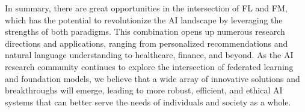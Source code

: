 


In summary, there are great opportunities in the intersection of FL and FM, 
which has the potential to revolutionize the AI landscape by leveraging the strengths of both paradigms. 
This combination opens up numerous research directions and applications, ranging from personalized recommendations and natural language understanding to healthcare, finance, and beyond. As the AI research community continues to explore the intersection of federated learning and foundation models, we believe that a wide array of innovative solutions and breakthroughs will emerge, leading to more robust, efficient, and ethical AI systems that can better serve the needs of individuals and society as a whole.


